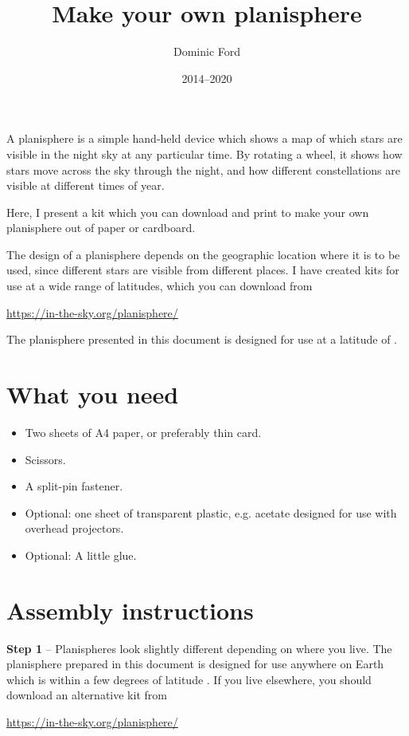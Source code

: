 \documentclass[a4paper,onecolumn,10pt]{article}
\title{Make your own planisphere}
\author{Dominic Ford}
\date{2014--2020}
\begin{document}
\maketitle
\setcounter{footnote}{1}

A planisphere is a simple hand-held device which shows a map of which stars are
visible in the night sky at any particular time. By rotating a wheel, it shows
how stars move across the sky through the night, and how different
constellations are visible at different times of year.

Here, I present a kit which you can download and print to make your own
planisphere out of paper or cardboard.

The design of a planisphere depends on the geographic location where it is to
be used, since different stars are visible from different places. I have
created kits for use at a wide range of latitudes, which you can download from

\url{https://in-the-sky.org/planisphere/}

The planisphere presented in this document is designed for use at a latitude of
.
 
\section*{What you need}

\begin{itemize}
\item Two sheets of A4 paper, or preferably thin card.
\item Scissors.
\item A split-pin fastener.
\item Optional: one sheet of transparent plastic, e.g. acetate designed for use with overhead projectors.
\item Optional: A little glue.
\end{itemize}

\section*{Assembly instructions}

{\bf Step 1} -- Planispheres look slightly different depending on where you
live. The planisphere prepared in this document is designed for use anywhere on
Earth which is within a few degrees of latitude . If you live
elsewhere, you should download an alternative kit from

\url{https://in-the-sky.org/planisphere/}
\end{document}
